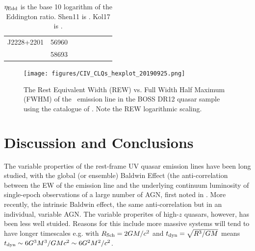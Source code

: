 \documentclass[a4paper,fleqn,usenatbib]{mnras}
\begin{document}
\begin{table}
\begin{tabular}{ll l l cc ll}
J2228+2201  & 56960    &               &                                  &                           &                                    &                 &   \\
                      & 58693    &              &                                   &                            &                                   &               &  \\
    \hline
    \hline
  \end{tabular}
  \caption{$\eta_{\rm Edd}$ is the base 10 logarithm of the Eddington ratio.
        Shen11 is \citet{Shen2011}. 
      Kol17 is \citet{Kozlowski2017}.}
\end{table}





\begin{figure}
  \centering
  \texttt{[image: figures/CIV\_CLQs\_hexplot\_20190925.png]}
   \vspace{-12pt}
  \caption[]{The Rest Equivalent Width (REW) vs. Full Width Half Maximum (FWHM) 
of the \civ\ emission line in the BOSS DR12 quasar sample using the catalogue 
of \citet{Hamann2017}. Note the REW logarithmic scaling.}
  \label{fig:REWvsFWHM}
\end{figure}

\section{Discussion and Conclusions}
The variable properties of the rest-frame UV quasar emission lines
have been long studied, with the global (or ensemble) Baldwin Effect
(the anti-correlation between the EW of the emission line and the
underlying continuum luminosity of single-epoch observations of a
large number of AGN, first noted in \citet{Baldwin1977}. 
More recently, the intrinsic Baldwin effect, the same anti-correlation but in an individual, variable AGN.
%
The variable properites of high-$z$ quasars, however, has been less 
well stuided. Reasons for this include more massive systems will tend to 
have longer timescales e.g. with $R_{\rm Sch}= 2GM /c^{2}$ and $t_{\rm dyn} =\sqrt{ R^{3}/GM}$
means   $t_{\rm dyn} \sim 6G^{3} M^{3} / GM c^{2} \sim 6G^{2} M^{2} / c^{2} $.
\end{document}
